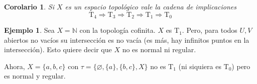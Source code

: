 \documentclass[12pt]{book}
\newtheorem{cor}[teo]{Corolario}
\theoremstyle{definition}
\newtheorem{ex}[teo]{Ejemplo}
\newcommand{\NN}{\mathbb{N}}
\let\emptyset\varnothing
\begin{document}
\begin{cor}
Si $X$ es un espacio topológico vale la cadena de implicaciones $$\mathrm{T}_4\Longrightarrow \mathrm{T}_3 \Longrightarrow \mathrm{T}_2\Longrightarrow \mathrm{T}_1\Longrightarrow \mathrm{T}_0$$
\end{cor}

\begin{ex}
Sea $X=\NN$ con la topología cofinita. $X$ es $\mathrm{T}_1$. Pero, para todos $U,V$ abiertos no vacíos su intersección es no vacía (es más, hay infinitos puntos en la intersección). Esto quiere decir que $X$ no es normal ni regular.

Ahora, $X=\{a,b,c\}$ con $\tau = \{\emptyset, \{a\},\{b,c\},X\}$ no es $\mathrm{T}_1$ (ni siquiera es $\mathrm{T}_0$) pero es normal y regular.
\end{ex}
\end{document}
